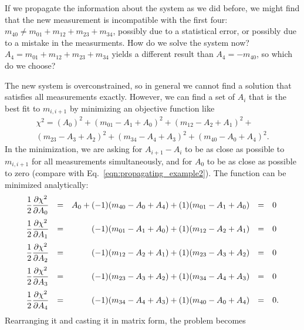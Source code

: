 \documentclass[12pt]{article}
\begin{document}
If we propagate the information about the system as we did before, we
might find that the new measurement is incompatible with the first
four: $m_{40} \ne m_{01} + m_{12} + m_{23} + m_{34}$, possibly due to
a statistical error, or possibly due to a mistake in the measurments.
How do we solve the system now?  $A_4 = m_{01} + m_{12} + m_{23} +
m_{34}$ yields a different result than $A_4 = -m_{40}$, so which do we
choose?

The new system is overconstrained, so in general we cannot find a
solution that satisfies all measurements exactly.  However, we can
find a set of $A_i$ that is the best fit to $m_{i,i+1}$ by minimizing
an objective function like
\begin{multline}
\chi^2 = (A_0)^2 + (m_{01} - A_1 + A_0)^2 + (m_{12} - A_2 + A_1)^2 + \\
 (m_{23} - A_3 + A_2)^2 + (m_{34} - A_4 + A_3)^2 + (m_{40} - A_0 + A_4)^2.
\end{multline}
In the minimization, we are asking for $A_{i+1} - A_i$ to be as close
as possible to $m_{i,i+1}$ for all measurements simultaneously, and
for $A_0$ to be as close as possible to zero (compare with
Eq.~\ref{eqn:propagating_example2}).  The function can be minimized
analytically:
\begin{equation}
\begin{array}{r c r c l}
\displaystyle \frac{1}{2} \frac{\partial \chi^2}{\partial A_0} &=& A_0 + (-1) (m_{40} - A_0 + A_4) + (1) (m_{01} - A_1 + A_0) &=& 0 \vspace{0.2 cm} \\
\displaystyle \frac{1}{2} \frac{\partial \chi^2}{\partial A_1} &=& (-1) (m_{01} - A_1 + A_0) + (1) (m_{12} - A_2 + A_1) &=& 0 \vspace{0.2 cm} \\
\displaystyle \frac{1}{2} \frac{\partial \chi^2}{\partial A_2} &=& (-1) (m_{12} - A_2 + A_1) + (1) (m_{23} - A_3 + A_2) &=& 0 \vspace{0.2 cm} \\
\displaystyle \frac{1}{2} \frac{\partial \chi^2}{\partial A_3} &=& (-1) (m_{23} - A_3 + A_2) + (1) (m_{34} - A_4 + A_3) &=& 0 \vspace{0.2 cm} \\
\displaystyle \frac{1}{2} \frac{\partial \chi^2}{\partial A_4} &=& (-1) (m_{34} - A_4 + A_3) + (1) (m_{40} - A_0 + A_4) &=& 0.
\end{array}
\end{equation}
Rearranging it and casting it in matrix form, the problem becomes
\end{document}
